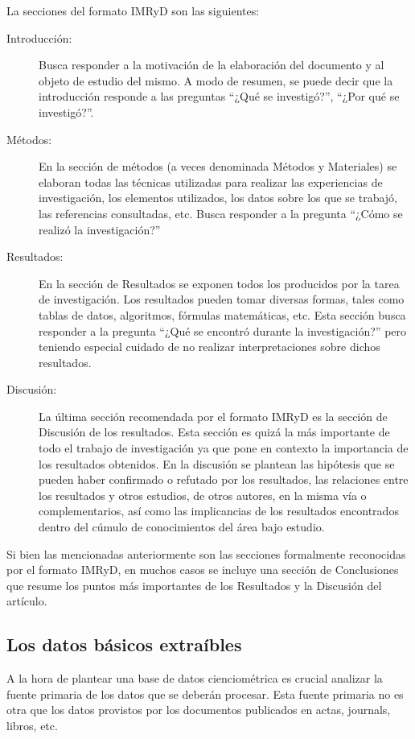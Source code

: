 La secciones del formato IMRyD son las siguientes:

\begin{description}
	\item[Introducción:] Busca responder a la motivación de la elaboración del documento y al objeto de estudio del mismo. A modo de resumen, se puede decir que la introducción responde a las preguntas ``¿Qué se investigó?'', ``¿Por qué se investigó?''.
	\item[Métodos:] En la sección de métodos (a veces denominada Métodos y Materiales) se elaboran todas las técnicas utilizadas para realizar las experiencias de investigación, los elementos utilizados, los datos sobre los que se trabajó, las referencias consultadas, etc. Busca responder a la pregunta ``¿Cómo se realizó la investigación?''
	\item[Resultados:] En la sección de Resultados se exponen todos los producidos por la tarea de investigación. Los resultados pueden tomar diversas formas, tales como tablas de datos, algoritmos, fórmulas matemáticas, etc. Esta sección busca responder a la pregunta ``¿Qué se encontró durante la investigación?'' pero teniendo especial cuidado de no realizar interpretaciones sobre dichos resultados.
	\item[Discusión:] La última sección recomendada por el formato IMRyD es la sección de Discusión de los resultados. Esta sección es quizá la más importante de todo el trabajo de investigación ya que pone en contexto la importancia de los resultados obtenidos. En la discusión se plantean las hipótesis que se pueden haber confirmado o refutado por los resultados, las relaciones entre los resultados y otros estudios, de otros autores, en la misma vía o complementarios, así como las implicancias de los resultados encontrados dentro del cúmulo de conocimientos del área bajo estudio.
\end{description}

Si bien las mencionadas anteriormente son las secciones formalmente reconocidas por el formato IMRyD, en muchos casos se incluye una sección de Conclusiones que resume los puntos más importantes de los Resultados y la Discusión del artículo.

\subsection{Los datos básicos extraíbles}

A la hora de plantear una base de datos cienciométrica es crucial analizar la fuente primaria de los datos que se deberán procesar. Esta fuente primaria no es otra que los datos provistos por los documentos publicados en actas, journals, libros, etc.

